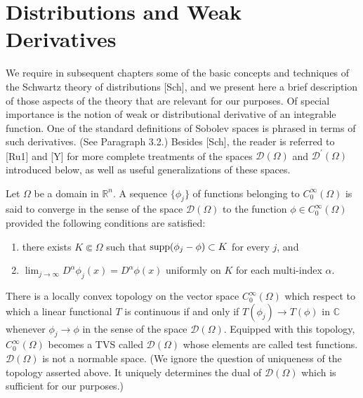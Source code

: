 \section{Distributions and Weak Derivatives}

\begin{para}
  We require in subsequent chapters some of the basic concepts and techniques of the Schwartz theory of distributions [Sch], and we present here a brief description of those aspects of the theory that are relevant for our purposes. Of special importance is the notion of weak or distributional derivative of an integrable function. One of the standard definitions of Sobolev spaces is phrased in terms of such derivatives. (See Paragraph 3.2.) Besides [Sch], the reader is referred to [Ru1] and [Y] for more complete treatments of the spaces $\mathscr{D}(\Omega)$ and $\mathscr{D}^{\prime}(\Omega)$ introduced below, as well as useful generalizations of these spaces.
\end{para}

\begin{para}
  Let $\Omega$ be a domain in $\mathbb{R}^n$. A sequence $\{\phi_j\}$ of functions belonging to $C_0^{\infty}(\Omega)$ is said to converge in the sense of the space $\mathscr{D}(\Omega)$ to the function $\phi \in C_0^{\infty}(\Omega)$ provided the following conditions are satisfied:
  \begin{enumerate}[label = (\roman*)]
    \item there exists $K \Subset \Omega$ such that $\operatorname{supp}(\phi_j-\phi) \subset K$ for every $j$, and
    \item $\lim _{j \rightarrow \infty} D^\alpha \phi_j(x)=D^\alpha \phi(x)$ uniformly on $K$ for each multi-index $\alpha$.
  \end{enumerate}
  There is a locally convex topology on the vector space $C_0^{\infty}(\Omega)$ which respect to 
  which a linear functional $T$ is continuous if and only if $T(\phi_j) \rightarrow T(\phi)$ in 
  $\mathbb{C}$ whenever $\phi_j \rightarrow \phi$ in the sense of the space $\mathscr{D}(\Omega)$. 
  Equipped with this topology, $C_0^{\infty}(\Omega)$ becomes a TVS called $\mathscr{D}(\Omega)$ 
  whose elements are called test functions. $\mathscr{D}(\Omega)$ is not a normable space.
  (We ignore the question of uniqueness of the topology asserted above.
  It uniquely determines the dual of $\mathscr{D}(\Omega)$ which is sufficient for our purposes.)
\end{para}


